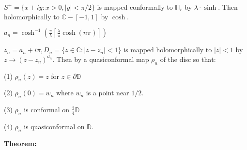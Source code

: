 \documentclass{beamer}
\begin{document}
\begin{frame} 

{\tiny $S^+ = \{ x + iy : x > 0, |y| < \pi/2 \}$ is mapped conformally to $\mathbb{H}_r$ by $\lambda\cdot\sinh$. Then holomorphically to $\mathbb{C} - [-1,1]$ by $\cosh$.

\vspace{2.5mm}

$a_n = \cosh^{-1}\left( \frac{\pi}{\lambda} \left[ \frac{\lambda}{\pi} \cosh(n\pi) \right] \right)$

\vspace{2.5mm}

$z_n = a_n + i\pi, D_n = \{ z \in \mathbb{C} : \left| z - z_n \right| < 1\} $ is mapped holomorphically to $|z|<1$ by $z\rightarrow (z - z_n)^{d_n}$. Then by a quasiconformal map $\rho_n$ of the disc so that: 

\hspace{5mm} (1) $\rho_n(z)=z$ for $z\in\partial\mathbb{D}$

\hspace{5mm} (2) $\rho_n(0)=w_n$ where $w_n$ is a point near $1/2$.

\hspace{5mm} (3) $\rho_n$ is conformal on $\frac{3}{4}\mathbb{D}$

\hspace{5mm} (4) $\rho_n$ is quasiconformal on $\mathbb{D}$.  

}

\vspace{5mm}

{\bf Theorem:} 


\end{frame}
\end{document}
